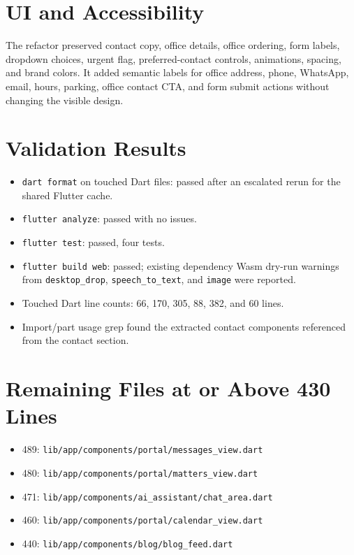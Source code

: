 \documentclass[11pt]{article}
\begin{document}
\section*{UI and Accessibility}
The refactor preserved contact copy, office details, office ordering, form
labels, dropdown choices, urgent flag, preferred-contact controls, animations,
spacing, and brand colors. It added semantic labels for office address, phone,
WhatsApp, email, hours, parking, office contact CTA, and form submit actions
without changing the visible design.

\section*{Validation Results}
\begin{itemize}
  \item \texttt{dart format} on touched Dart files: passed after an escalated
  rerun for the shared Flutter cache.
  \item \texttt{flutter analyze}: passed with no issues.
  \item \texttt{flutter test}: passed, four tests.
  \item \texttt{flutter build web}: passed; existing dependency Wasm dry-run
  warnings from \texttt{desktop\_drop}, \texttt{speech\_to\_text}, and
  \texttt{image} were reported.
  \item Touched Dart line counts: 66, 170, 305, 88, 382, and 60 lines.
  \item Import/part usage grep found the extracted contact components
  referenced from the contact section.
\end{itemize}

\section*{Remaining Files at or Above 430 Lines}
\begin{itemize}
  \item 489: \texttt{lib/app/components/portal/messages\_view.dart}
  \item 480: \texttt{lib/app/components/portal/matters\_view.dart}
  \item 471: \texttt{lib/app/components/ai\_assistant/chat\_area.dart}
  \item 460: \texttt{lib/app/components/portal/calendar\_view.dart}
  \item 440: \texttt{lib/app/components/blog/blog\_feed.dart}
\end{itemize}
\end{document}
